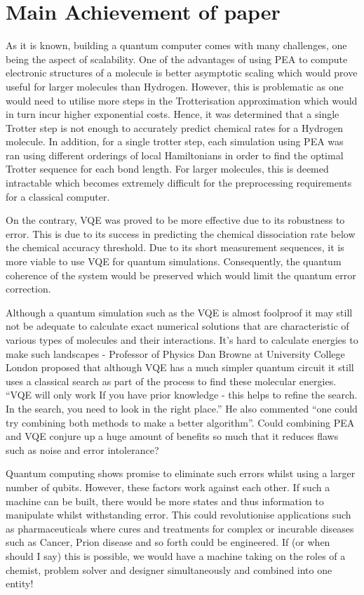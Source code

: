 \documentclass[12pt]{article}
\begin{document}
\section{Main Achievement of paper}
As it is known, building a quantum computer comes with many challenges, one being the aspect of scalability. One of the advantages of using PEA to
compute electronic structures of a molecule is better asymptotic scaling which would prove useful for larger molecules than Hydrogen. However, this
is problematic as one would need to utilise more steps in the Trotterisation approximation which would in turn incur higher exponential costs. Hence,
 it was determined that a single Trotter step is not enough to accurately predict chemical rates for a Hydrogen molecule. In addition, for a single
 trotter step, each simulation using PEA was ran using different orderings of local Hamiltonians in order to find the optimal Trotter sequence for
 each bond length. For larger molecules, this is deemed intractable which becomes extremely difficult for the preprocessing requirements for a
 classical computer.

On the contrary, VQE was proved to be more effective due to its robustness to error. This is due to its success in predicting the chemical dissociation
 rate below the chemical accuracy threshold. Due to its short measurement sequences, it is more viable to use VQE for quantum simulations.
 Consequently, the quantum coherence of the system would be preserved which would limit the quantum error correction.

 Although a quantum simulation such as the VQE is almost foolproof it may still not be adequate to calculate exact numerical solutions that are
 characteristic of various types of molecules and their interactions. It’s hard to calculate energies to make such landscapes - Professor of Physics
 Dan Browne at University College London proposed that although VQE has a much simpler quantum circuit it still uses a classical search as part of
 the process to find these molecular energies. “VQE will only work If you have prior knowledge - this helps to refine the search. In the search, you
 need to look in the right place.” He also commented “one could try combining both methods to make a better algorithm”. Could combining PEA and VQE
 conjure up a huge amount of benefits so much that it reduces flaws such as noise and error intolerance?

 Quantum computing shows promise to eliminate such errors whilst using a larger number of qubits. However, these factors work against each other.
 If such a machine can be built, there would be more states and thus information to manipulate whilst withstanding error. This could revolutionise
 applications such as pharmaceuticals where cures and treatments for complex or incurable diseases such as Cancer, Prion disease and so forth could
 be engineered. If (or when should I say) this is possible,  we would have a machine taking on the roles of a chemist, problem solver and designer
  simultaneously and combined into one entity!
\end{document}
